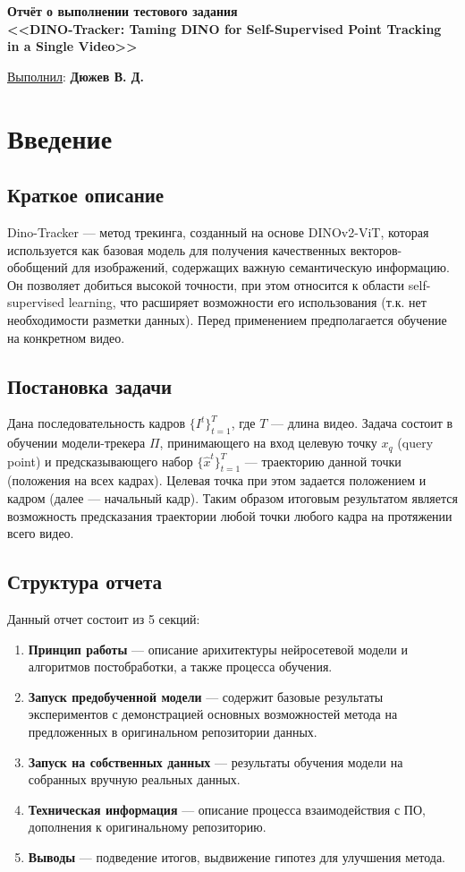 \documentclass[a4paper, 14pt]{extarticle}
\theoremstyle{definition}
\theoremstyle{plain}
\theoremstyle{remark}
\newcommand*{\titlePage}{
	\thispagestyle{title}
	\begingroup
	\begin{center}
		\vspace*{3ex}
		{\small
		}
		
		\vspace*{2ex}
		
		{\normalsize
		}
		
		\vspace*{30ex}
		
		{\Large \bfseries 
			Отчёт о выполнении тестового задания\\
			{\large <<DINO-Tracker: Taming DINO for Self-Supervised
			Point Tracking in a Single Video>>\\
				}
			
		}
		
	\end{center}
	\vspace*{10ex}
	\begin{flushright}
		{\large 
			\underline{Выполнил}: \textbf{Дюжев В. Д.}
		}

	\end{flushright}	
	\newpage
	\setcounter{page}{1}
	\endgroup}
\begin{document}
\renewcommand{\contentsname}{\hfillОГЛАВЛЕНИЕ\hfill} 
\titlePage
\thispagestyle{plain}
\tableofcontents
\pagestyle{style}

\newpage
\setcounter{page}{1}


\section{Введение}
\subsection{Краткое описание}
Dino-Tracker --- метод трекинга, созданный на основе DINOv2-ViT, которая используется как базовая модель для получения качественных векторов-обобщений для изображений, содержащих важную семантическую информацию. Он позволяет добиться высокой точности, при этом относится к области self-supervised learning, что расширяет возможности его использования (т.к. нет необходимости разметки данных). Перед применением предполагается обучение на конкретном видео.

\subsection{Постановка задачи}
Дана последовательность кадров $\{I^t\}^T_{t=1}$, где $T$ --- длина видео. Задача состоит в обучении модели-трекера $\Pi$, принимающего на вход целевую точку $x_q$ (query point) и предсказывающего набор $\{\hat{x}^t\}^T_{t=1}$ --- траекторию данной точки (положения на всех кадрах). Целевая точка при этом задается положением и кадром (далее --- начальный кадр).
Таким образом итоговым результатом является возможность предсказания траектории любой точки любого кадра на протяжении всего видео.

\subsection{Структура отчета}
Данный отчет состоит из 5 секций:
\begin{enumerate}
	\item \textbf{Принцип работы} --- описание арихитектуры нейросетевой модели и алгоритмов постобработки, а также процесса обучения.
	\item \textbf{Запуск предобученной модели} --- содержит базовые результаты экспериментов с демонстрацией основных возможностей метода на предложенных в оригинальном репозитории данных.
	\item \textbf{Запуск на собственных данных} --- результаты обучения модели на собранных вручную реальных данных.
	\item \textbf{Техническая информация} --- описание процесса взаимодействия с ПО, дополнения к оригинальному репозиторию.
	\item \textbf{Выводы} --- подведение итогов, выдвижение гипотез для улучшения метода.
\end{enumerate}
\end{document}
